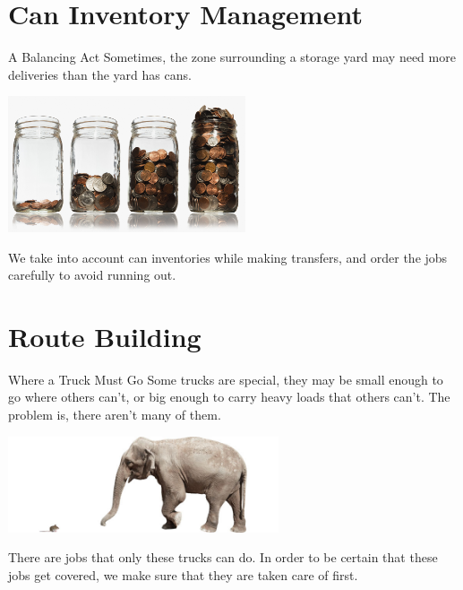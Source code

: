 \documentclass{beamer}
\begin{document}
\section{Can Inventory Management}
\begin{frame}{A Balancing Act}
	Sometimes, the zone surrounding a storage yard may need more deliveries than the yard has cans.
	\begin{center}
		\includegraphics[width=7cm]{coins.jpg}
	\end{center}
	\pause
	We take into account can inventories while making transfers, and order the
  jobs carefully to avoid running out.
\end{frame}

\section{Route Building}
\begin{frame}{Where a Truck Must Go}
	Some trucks are special, they may be small enough to go where others can't, or big enough to carry heavy loads that others can't. The problem is, there aren't many of them.
	\vspace{.5cm}
	\begin{center}
		\includegraphics[width=8cm]{mouse_elephant.jpg}
	\end{center}

	\vspace{.5cm}
	\pause
	There are jobs that only these trucks can do. In order to be certain that these jobs get covered, we make sure that they are taken care of first.
\end{frame}
\end{document}
